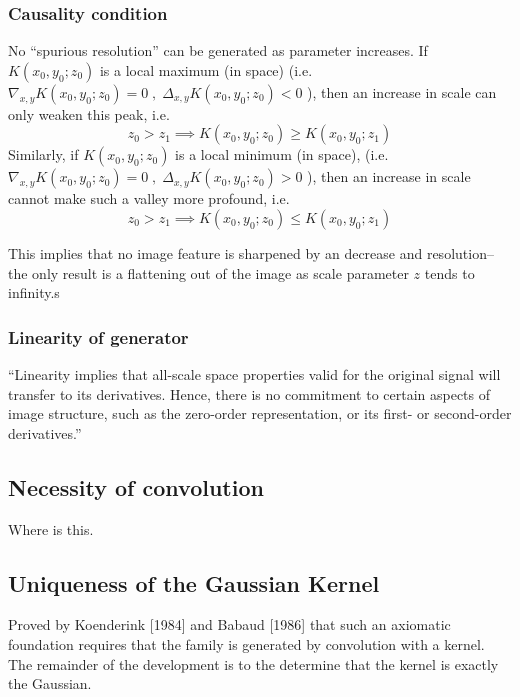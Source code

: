 	\subsubsection{Causality condition}
		No ``spurious resolution'' can be generated as parameter increases. 
		If $K(x_0,y_0;z_0)$ is a local maximum (in space)
			(i.e. $\nabla_{x,y}K(x_0,y_0; z_0) = 0 \;,\; \Delta_{x,y} K(x_0,y_0;z_0) < 0$ ),
			then an increase in scale can only weaken this peak, i.e.
			\begin{equation}
			z_0 > z_1 \implies K(x_0,y_0;z_0) \ge K(x_0,y_0;z_1)
			\end{equation}
		Similarly, if $K(x_0,y_0;z_0)$ is a local minimum (in space), (i.e. $\nabla_{x,y}K(x_0,y_0; z_0) = 0 \;,\; \Delta_{x,y} K(x_0,y_0;z_0) > 0$ ),
		then an increase in scale cannot make such a valley more profound, i.e.
		\begin{equation}
		z_0 > z_1 \implies K(x_0,y_0;z_0) \le K(x_0,y_0;z_1)
		\end{equation}
	
	This implies that no image feature is sharpened by an decrease and resolution--the only result is a flattening out of the image as scale parameter $z$ tends to infinity.s
	
	
	\subsubsection{Linearity of generator}
	``Linearity implies that all-scale space properties valid for the original signal will transfer to its derivatives. Hence, there is no commitment to certain aspects of image structure, such as the zero-order representation, or its first- or second-order derivatives.''


\subsection{Necessity of convolution}
	Where is this.
\subsection{Uniqueness of the Gaussian Kernel}
	Proved  by Koenderink [1984] and Babaud [1986] that such an axiomatic foundation requires that the family is generated by convolution with a kernel. The remainder of the development is to the determine that the kernel is exactly the Gaussian.
	 
